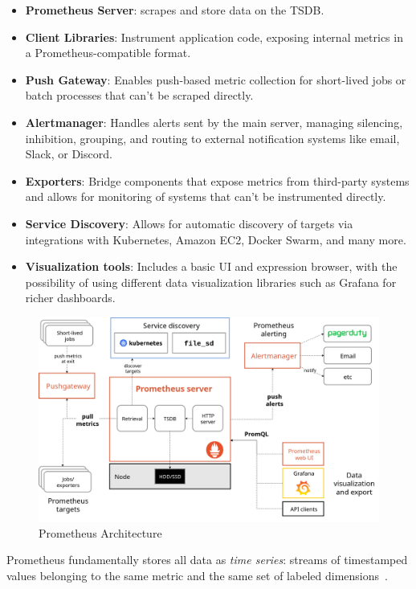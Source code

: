 \begin{itemize}
    \item \textbf{Prometheus Server}: scrapes and store data on the \ac{TSDB}.
    \item \textbf{Client Libraries}: Instrument application code, exposing internal metrics in a
    Prometheus-compatible format.
    \item \textbf{Push Gateway}: Enables push-based metric collection for short-lived jobs or batch processes that
    can't be scraped directly.
    \item \textbf{Alertmanager}: Handles alerts sent by the main server, managing silencing, inhibition, grouping, and routing to external notification systems like email, Slack, or Discord.
    \item \textbf{Exporters}: Bridge components that expose metrics from third-party systems and allows for monitoring of
    systems that can't be instrumented directly.
    \item \textbf{Service Discovery}: Allows for automatic discovery of targets via integrations with Kubernetes,
    Amazon EC2, Docker Swarm, and many more.
    \item \textbf{Visualization tools}: Includes a basic UI and expression browser, with the possibility of using
    different data visualization libraries such as Grafana for richer dashboards.
\end{itemize}

\begin{figure}[h]
    \centering
    \includegraphics[width=\linewidth, keepaspectratio]{./figures/prometheus_arch}
    \caption{Prometheus Architecture}
\end{figure}

Prometheus fundamentally stores all data as \textit{time series}: streams of timestamped
values belonging to the same metric and the same set of labeled dimensions~\cite{prometheus_data_model}.\\

